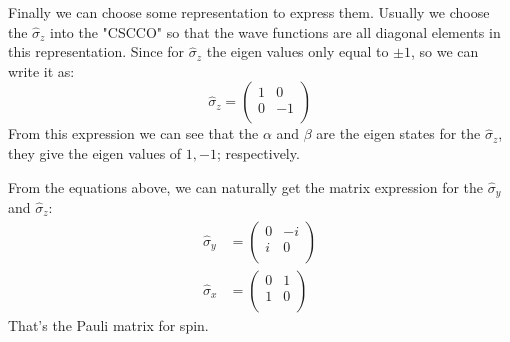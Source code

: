 Finally we can choose some representation to express them. Usually
we choose the $\hat{\sigma}_{z}$ into the "CSCCO" so that the wave
functions are all diagonal elements in this representation. Since
for $\hat{\sigma}_{z}$ the eigen values only equal to $\pm 1$, so we
can write it as:
\begin{equation}\label{}
\hat{\sigma}_{z} = \begin{pmatrix}
                     1 & 0 \\
                     0 & -1 \\
                   \end{pmatrix}
\end{equation}
From this expression we can see that the $\alpha$ and $\beta$ are
the eigen states for the $\hat{\sigma}_{z}$, they give the eigen
values of $1, -1$; respectively.

From the equations above, we can naturally get the matrix expression
for the $\hat{\sigma}_{y}$ and $\hat{\sigma}_{z}$:
\begin{align}\label{}
\hat{\sigma}_{y} &= \begin{pmatrix}
                     0 & -i \\
                     i & 0 \\
                   \end{pmatrix} \nonumber \\
\hat{\sigma}_{x} &= \begin{pmatrix}
                     0 & 1 \\
                     1 & 0 \\
                   \end{pmatrix}
\end{align}
That's the Pauli matrix for spin.

